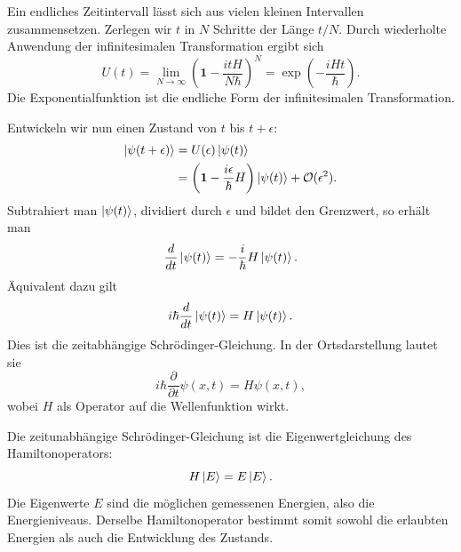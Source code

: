 \begin{classroomqa}
\end{classroomqa}

Ein endliches Zeitintervall lässt sich aus vielen kleinen Intervallen zusammensetzen. Zerlegen wir \(t\) in \(N\) Schritte der Länge \(t/N\). Durch wiederholte Anwendung der infinitesimalen Transformation ergibt sich
\begin{equation}
U(t)
=
\lim_{N\to\infty}
\left(
\mathbf 1-\frac{itH}{N\hbar}
\right)^N
=
\exp\left(-\frac{iHt}{\hbar}\right).
\end{equation}
Die Exponentialfunktion ist die endliche Form der infinitesimalen Transformation.

Entwickeln wir nun einen Zustand von \(t\) bis \(t+\epsilon\):
\begin{align}
\left\lvert\psi(t+\epsilon)\right\rangle
&=
U(\epsilon)\left\lvert\psi(t)\right\rangle
\\
&=
\left(
\mathbf 1-\frac{i\epsilon}{\hbar}H
\right)\left\lvert\psi(t)\right\rangle
+\mathcal O(\epsilon^2).
\end{align}
Subtrahiert man \(\left\lvert\psi(t)\right\rangle\), dividiert durch \(\epsilon\) und bildet den Grenzwert, so erhält man
\begin{equation}
\frac{d}{dt}\left\lvert\psi(t)\right\rangle
=
-\frac{i}{\hbar}H\left\lvert\psi(t)\right\rangle.
\end{equation}
Äquivalent dazu gilt
\begin{equation}
i\hbar\frac{d}{dt}\left\lvert\psi(t)\right\rangle
=
H\left\lvert\psi(t)\right\rangle.
\end{equation}
Dies ist die zeitabhängige Schr\"odinger-Gleichung. In der Ortsdarstellung lautet sie
\begin{equation}
i\hbar\frac{\partial}{\partial t}\psi(x,t)
=
H\psi(x,t),
\end{equation}
wobei \(H\) als Operator auf die Wellenfunktion wirkt.

Die zeitunabhängige Schr\"odinger-Gleichung ist die Eigenwertgleichung des Hamiltonoperators:
\begin{equation}
H\left\lvert E\right\rangle=E\left\lvert E\right\rangle.
\end{equation}
Die Eigenwerte \(E\) sind die möglichen gemessenen Energien, also die Energieniveaus. Derselbe Hamiltonoperator bestimmt somit sowohl die erlaubten Energien als auch die Entwicklung des Zustands.

